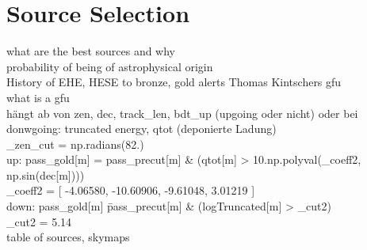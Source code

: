 \chapter{Source Selection}
what are the best sources and why\\
probability of being of astrophysical origin\\
History of EHE, HESE to bronze, gold alerts Thomas Kintschers gfu\\
what is a gfu\\
hängt ab von zen, dec, track\_len, bdt\_up (upgoing oder nicht) oder bei donwgoing: truncated energy, qtot (deponierte Ladung)\\
\_zen\_cut = np.radians(82.)\\
up: pass\_gold[m]   = pass\_precut[m] \& (qtot[m] > 10.\*\*np.polyval(\_coeff2, np.sin(dec[m])))\\
\_coeff2 = [  -4.06580, -10.60906,  -9.61048,   3.01219 ]\\
down: pass\_gold[m]   \= pass\_precut[m] \& (logTruncated[m] > \_cut2)\\
\_cut2   = 5.14\\

table of sources, skymaps\\

